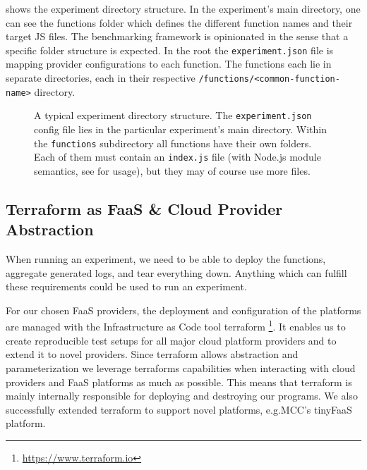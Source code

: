 \documentclass[../main.tex]{subfiles}
\begin{document}
 shows the experiment directory structure.
In the experiment's main directory, one can see the functions folder which defines the different function names and their target JS files. 
The benchmarking framework is opinionated in the sense that a specific folder structure is expected. 
In the root the \texttt{experiment.json} file is mapping provider configurations to each function. 
The functions each lie in separate directories, each in their respective \texttt{/functions/<common-function-name>} directory.

\begin{figure}
\begin{tcolorbox}
\end{tcolorbox}
\caption[Typical Experiment Directory Structure.]{%
  A typical experiment directory structure. The \texttt{experiment.json} config file lies in the particular experiment's main directory.
  Within the \texttt{functions} subdirectory all functions have their own folders. 
  Each of them must contain an \texttt{index.js} file (with Node.js module semantics, see  for usage),
  but they may of course use more files.
}%
\label{fig:experimentDirTree}
\end{figure}

\subsection{Terraform as FaaS \& Cloud Provider Abstraction}%
\label{sec:terraform}

When running an experiment, we need to be able to deploy the functions, aggregate generated logs, and tear everything down. 
Anything which can fulfill these requirements could be used to run an experiment.

For our chosen FaaS providers, the deployment and configuration of the platforms are managed with the Infrastructure as Code tool terraform%
\footnote{\url{https://www.terraform.io}}. 
It enables us to create reproducible test setups for all major cloud platform providers and to extend it to novel providers. 
Since terraform allows abstraction and parameterization we 
leverage terraforms capabilities when interacting with cloud providers and FaaS platforms as much as possible.
This means that terraform is mainly internally responsible for deploying and destroying our programs.
We also successfully extended terraform to support novel platforms, e.g.\@ MCC's tinyFaaS platform.
\end{document}
